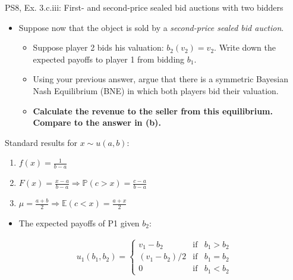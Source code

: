 \begin{frame}{PS8, Ex. 3.c.iii: First- and second-price sealed bid auctions with two bidders}
    \begin{multicols}{2}
      \begin{itemize}
        \item[(c)] Suppose now that the object is sold by a \textit{second-price sealed bid auction}.
        \begin{itemize}\normalsize
          \item[i.]   Suppose player 2 bids his valuation: $b_2(v_2) = v_2$. Write down the expected payoffs to player 1 from bidding $b_1$.
          \item[ii.]  Using your previous answer, argue that there is a symmetric Bayesian Nash Equilibrium (BNE) in which both players bid their valuation.
          \item[iii.] \textbf{Calculate the revenue to the seller from this equilibrium. Compare to the answer in (b).}
        \end{itemize}
      \end{itemize}
      Standard results for $x\sim u(a, b):$
      \vspace{-6pt}
      \begin{enumerate}
        \item[PDF:] $f(x)=\frac{1}{b-a}$
        \item[CDF:] $F(x)=\frac{x-a}{b-a}\Rightarrow\mathbb{P}(c>x)=\frac{c-a}{b-a}$
        \item[Mean:] $\mu=\frac{a+b}{2}\Rightarrow\mathbb{E}(c<x)=\frac{a+x}{2}$
      \end{enumerate}
      \vfill\null\columnbreak
      \begin{itemize}
        \item[(i)] The expected payoffs of P1 given $b_2$:
      \end{itemize}
      \vspace{-16pt}
      \begin{align*}
        u_1(b_1,b_2)=\left\{\begin{array}{lcl}
          v_1-b_2     & \text{if} & b_1>b_2 \\
          (v_1-b_2)/2 & \text{if} & b_1=b_2 \\
          0           & \text{if} & b_1<b_2
        \end{array}\right.
      \end{align*}
      \vspace{-18pt}
      \begin{itemize}

\end{itemize}
\end{multicols}
\end{frame}
